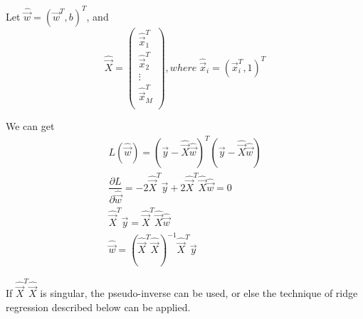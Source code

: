 Let $\widehat{\vec{w}}=\left(\vec{w}^T,b\right)^T$,  and
\begin{equation}
\widehat{\vec{X}}=\left(\begin{array}{lcr}
\widehat{\vec{x}}_1^T\\
\widehat{\vec{x}}_2^T\\
\vdots \\
\widehat{\vec{x}}_M^T\\
\end{array}
\right), where\; \widehat{\vec{x}}_i=\left(\vec{x}_i^T,1\right)^T
\end{equation}

We can get
\begin{equation}
\begin{array}{lcr}
L(\widehat{\vec{w}})=\left(\vec{y}-\widehat{\vec{X}}\widehat{\vec{w}}\right)^T\left(\vec{y}-\widehat{\vec{X}}\widehat{\vec{w}}\right)\\
\dfrac{\partial L}{\partial{\widehat{\vec{w}}}}=-2\widehat{\vec{X}}^T\vec{y}+2\widehat{\vec{X}}^T\widehat{\vec{X}}\widehat{\vec{w}}=0\\
\widehat{\vec{X}}^T\vec{y}=\widehat{\vec{X}}^T\widehat{\vec{X}}\widehat{\vec{w}}\\
\widehat{\vec{w}}=\left(\widehat{\vec{X}}^T\widehat{\vec{X}}\right)^{-1}\widehat{\vec{X}}^T\vec{y}
\end{array}
\end{equation}

If $\widehat{\vec{X}}^T\widehat{\vec{X}}$ is singular, the pseudo-inverse can be used, or else the technique of ridge regression described below can be applied.
